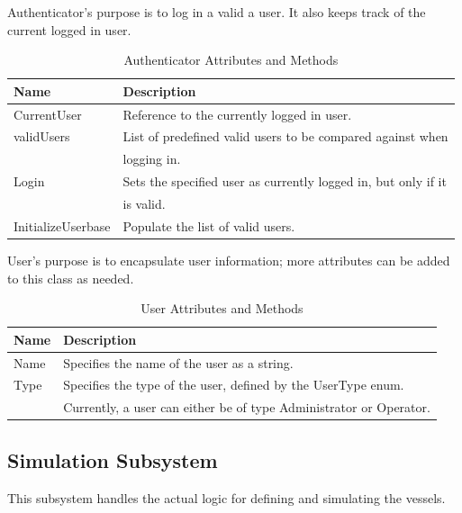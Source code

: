 \documentclass[12pt]{article}
\begin{document}
\vspace*{0.2in}
\vspace*{0.15in}
Authenticator’s purpose is to log in a valid a user.  It also keeps track of the current logged in user.
\begin{table}[ht]
\centering
   \begin{tabular}{|l|l|}
        \hline
        {\large Name} & {\large Description} \\
        \hline\hline
        CurrentUser & Reference to the currently logged in user.\\
        \hline
        validUsers & List of predefined valid users to be compared against when\\
        & logging in.\\
        \hline
        Login & Sets the specified user as currently logged in, but only if it\\
        & is valid.\\
        \hline
        InitializeUserbase & Populate the list of valid users.\\
        \hline
    \end{tabular}
\caption{Authenticator Attributes and Methods}
\end{table}

\vspace*{0.2in}
\vspace*{0.15in}
User’s purpose is to encapsulate user information; more attributes can be added to this class as needed.
\begin{table}[ht]
\centering
   \begin{tabular}{|l|l|}
        \hline
        {\large Name} & {\large Description} \\
        \hline\hline
        Name & Specifies the name of the user as a string.\\
        \hline
        Type & Specifies the type of the user, defined by the UserType enum.\\
         & Currently, a user can either be of type Administrator or Operator.
\\
        \hline
    \end{tabular}
\caption{User Attributes and Methods}
\end{table}
\clearpage



\subsection{Simulation Subsystem}
This subsystem handles the actual logic for defining and simulating the vessels.
\end{document}
